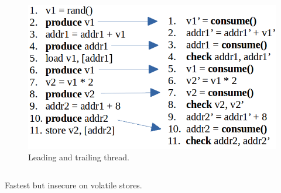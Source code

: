 \documentclass[xcolor=pdftex,dvipsnames,table]{beamer}
\begin{document}
\begin{frame}
\begin{columns}[c]
		\column{3in}        
        	\begin{figure}[H]
        		\begin{center}
                	\captionsetup{labelformat=empty,labelsep=none}
                	\includegraphics[scale=0.4]{CodeTransformation-NotCyclic.png}
                	\caption{Leading and trailing thread.}
                \end{center}
        	\end{figure}
            
    \end{columns} \pause
    
    	\begin{shaded}
    		\centerline{Fastest but insecure on volatile stores.}
    	\end{shaded}
                
        
\end{frame}
\end{document}
